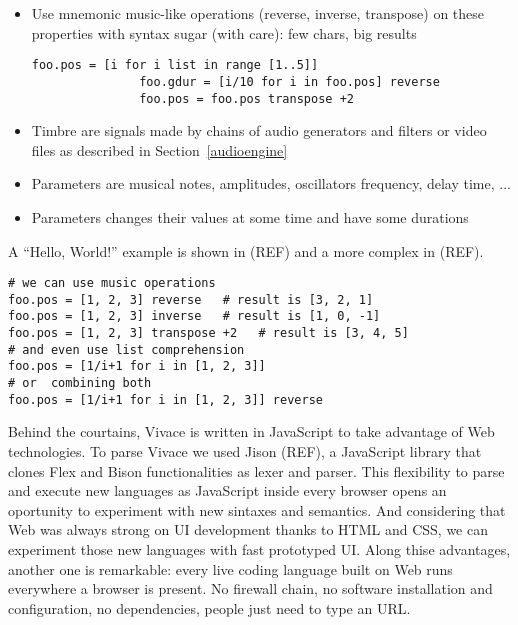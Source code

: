 \documentclass[letterpaper, 12pt]{article}
\begin{document}
\begin{itemize}
\item Use mnemonic music-like operations (reverse, inverse, transpose) on these properties with syntax sugar (with care): few chars, big results
            \begin{Verbatim}[fontfamily=courier, xleftmargin=\parindent]
               foo.pos = [i for i list in range [1..5]]
               foo.gdur = [i/10 for i in foo.pos] reverse
               foo.pos = foo.pos transpose +2
            \end{Verbatim}
            
\item Timbre are signals made by chains of audio generators and filters or video files as described in Section~\ref{audioengine}
\item Parameters are musical notes, amplitudes, oscillators frequency, delay time, ...
\item Parameters changes their values at some time and have some durations
\end{itemize}
A ``Hello, World!'' example is shown in (REF) and a more complex in (REF).
\begin{Verbatim}[fontfamily=courier, xleftmargin=\parindent]
# we can use music operations
foo.pos = [1, 2, 3] reverse   # result is [3, 2, 1]
foo.pos = [1, 2, 3] inverse   # result is [1, 0, -1]
foo.pos = [1, 2, 3] transpose +2   # result is [3, 4, 5]
# and even use list comprehension
foo.pos = [1/i+1 for i in [1, 2, 3]]
# or  combining both
foo.pos = [1/i+1 for i in [1, 2, 3]] reverse
\end{Verbatim}
Behind the courtains, Vivace is written in JavaScript to take advantage of Web technologies.
To parse Vivace we used Jison (REF), a JavaScript library that clones Flex and Bison functionalities as lexer and parser. This flexibility to parse and execute new languages as JavaScript inside every browser opens an oportunity to experiment with new sintaxes and semantics. And considering that Web was always strong on UI development thanks to HTML and CSS, we can experiment those new languages with fast prototyped UI. Along thise advantages, another one is remarkable: every live coding language built on Web runs everywhere a browser is present. No firewall chain, no software installation and configuration, no dependencies, people just need to type an URL.
\end{document}
